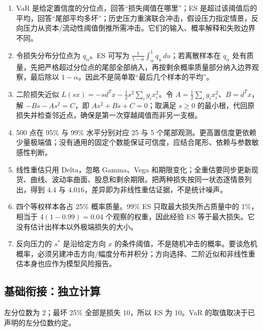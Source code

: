
\begin{enumerate}[leftmargin=*]
  \item VaR 是给定置信度的分位点，回答“损失阈值在哪里”；ES 是超过该阈值后的平均，回答“尾部平均多坏”；历史压力重演联合冲击，假设压力指定情景，反向压力从资本/流动性阈值倒推所需冲击。它们的输入、概率解释和失败边界不同。
  \item 令损失分布分位点为 $q_\alpha$。ES 可写为 $\frac1{1-\alpha}\int_\alpha^1q_u\,du$；若离散样本在 $q_\alpha$ 处有质量，先把严格超过分位点的尾部全部纳入，再按剩余概率质量部分纳入边界观察，最后除以 $1-\alpha$。因此不是简单取“最后几个样本的平均”。
  \item 二阶损失近似 $L(sx)=-s d^Tx-\frac12s^2\sum_ig_ix_i^2$。令 $A=\frac12\sum_ig_ix_i^2$、$B=d^Tx$，解 $-Bs-As^2=C$，即 $As^2+Bs+C=0$；取满足 $s\ge0$ 的最小根，代回原损失并检查邻近点，确保是第一次穿越阈值而非另一支根。
  \item 500 点在 95\% 与 99\% 水平分别对应 25 与 5 个尾部观测。更高置信度更依赖少量极端值；没有通用的固定个数能保证可信度，应结合尾形、依赖与参数敏感性判断。
  \item 线性重估只用 Delta，忽略 Gamma、Vega 和期限变化；全重估要同步更新现货、曲线、波动率曲面、股息和剩余期限。把两种损失按同一状态逐情景列出，得到 $4.4$ 与 $4.016$，差异即为非线性重估证据，不是统计噪声。
  \item 四个等权样本各占 25\% 概率质量。99\% ES 只取最大损失所占质量中的 1\%，相当于 $4(1-0.99)=0.04$ 个观察的权重，因此经验 ES 等于最大损失。它没有估计出样本以外极端损失的大小。
  \item 反向压力的 $s^*$ 是沿给定方向 $x$ 的条件阈值，不是随机冲击的概率。要谈危机概率，必须另建冲击方向/幅度分布并积分；方向选择、二阶近似和非线性重估本身也应作为模型风险报告。
\end{enumerate}

\subsection*{基础衔接：独立计算}
左分位数为 2；最坏 25\% 全部是损失 10，所以 ES 为 10。VaR 的取值取决于已声明的左分位数约定。


\MFQMappedPortfolioTailSolutions
